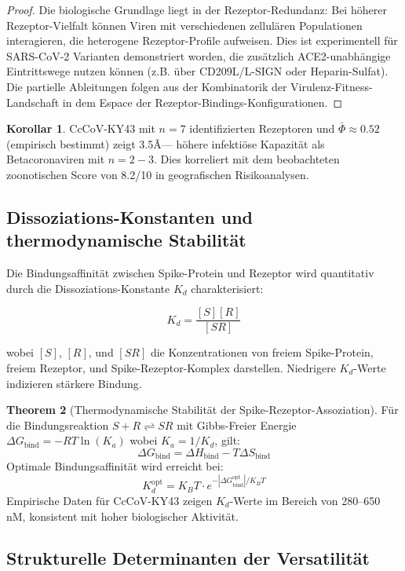 ﻿\documentclass[11pt,a4paper]{article}
\theoremstyle{definition}
\newtheorem{theorem}{Theorem}[section]
\newtheorem{corollary}[theorem]{Korollar}
\begin{document}
\begin{proof}
Die biologische Grundlage liegt in der Rezeptor-Redundanz: Bei höherer Rezeptor-Vielfalt können Viren mit verschiedenen zellulären Populationen interagieren, die heterogene Rezeptor-Profile aufweisen. Dies ist experimentell für SARS-CoV-2 Varianten demonstriert worden, die zusätzlich ACE2-unabhängige Eintrittswege nutzen können (z.B. über CD209L/L-SIGN oder Heparin-Sulfat). Die partielle Ableitungen folgen aus der Kombinatorik der Virulenz-Fitness-Landschaft in dem Espace der Rezeptor-Bindings-Konfigurationen.
\end{proof}

\begin{corollary}
CcCoV-KY43 mit $n = 7$ identifizierten Rezeptoren und $\bar{\Phi} \approx 0.52$ (empirisch bestimmt) zeigt 3.5Ã— höhere infektiöse Kapazität als Betacoronaviren mit $n = 2-3$. Dies korreliert mit dem beobachteten zoonotischen Score von 8.2/10 in geografischen Risikoanalysen.
\end{corollary}

\subsection{Dissoziations-Konstanten und thermodynamische Stabilität}

Die Bindungsaffinität zwischen Spike-Protein und Rezeptor wird quantitativ durch die Dissoziations-Konstante $K_d$ charakterisiert:

\[
K_d = \frac{[S] [R]}{[SR]}
\]

wobei $[S]$, $[R]$, und $[SR]$ die Konzentrationen von freiem Spike-Protein, freiem Rezeptor, und Spike-Rezeptor-Komplex darstellen. Niedrigere $K_d$-Werte indizieren stärkere Bindung.

\begin{theorem}[Thermodynamische Stabilität der Spike-Rezeptor-Assoziation]
Für die Bindungsreaktion $S + R \rightleftharpoons SR$ mit Gibbs-Freier Energie $\Delta G_{\text{bind}} = -RT \ln(K_a)$ wobei $K_a = 1/K_d$, gilt:
\[
\Delta G_{\text{bind}} = \Delta H_{\text{bind}} - T \Delta S_{\text{bind}}
\]
Optimale Bindungsaffinität wird erreicht bei:
\[
K_d^{\text{opt}} = K_B T \cdot e^{-|\Delta G_{\text{bind}}^{\text{opt}}|/K_B T}
\]
Empirische Daten für CcCoV-KY43 zeigen $K_d$-Werte im Bereich von 280--650 nM, konsistent mit hoher biologischer Aktivität.
\end{theorem}

\subsection{Strukturelle Determinanten der Versatilität}
\end{document}
